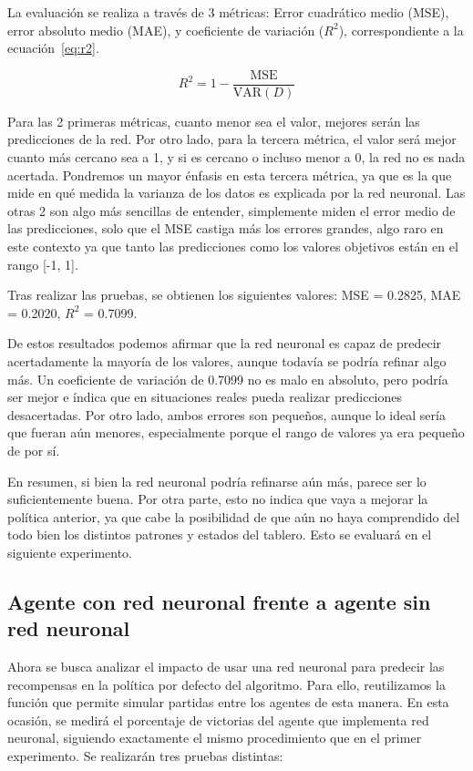 \documentclass[conference,a4paper]{IEEEtran}
\begin{document}
La evaluación se realiza a través de 3 métricas: Error cuadrático medio (MSE), error absoluto medio (MAE), y coeficiente de variación ($R^2$), correspondiente a la ecuación~\eqref{eq:r2}. 

\begin{equation}
  \label{eq:r2}
  R^2 = 1 - \frac{\mathrm{MSE}}{\mathrm{VAR}(D)}
\end{equation}

Para las 2 primeras métricas, cuanto menor sea el valor, mejores serán las predicciones de la red. Por otro lado, 
para la tercera métrica, el valor será mejor cuanto más cercano sea a 1, y si es cercano o incluso menor a 0, la red 
no es nada acertada. Pondremos un mayor énfasis en esta tercera métrica, ya que es la que mide en qué medida la 
varianza de los datos es explicada por la red neuronal. Las otras 2 son algo más sencillas de entender, simplemente 
miden el error medio de las predicciones, solo que el MSE castiga más los errores grandes, algo raro en este contexto 
ya que tanto las predicciones como los valores objetivos están en el rango [-1, 1].

Tras realizar las pruebas, se obtienen los siguientes valores: MSE = 0.2825, MAE = 0.2020, $R^2$ = 0.7099.

De estos resultados podemos afirmar que la red neuronal es capaz de predecir acertadamente la mayoría de los valores, aunque todavía 
se podría refinar algo más. Un coeficiente de variación de 0.7099 no es malo en absoluto, pero podría ser mejor e índica que en situaciones 
reales pueda realizar predicciones desacertadas. Por otro lado, ambos errores son pequeños, aunque lo ideal sería que fueran aún menores, 
especialmente porque el rango de valores ya era pequeño de por sí.

En resumen, si bien la red neuronal podría refinarse aún más, parece ser lo suficientemente buena. Por otra parte, esto no 
indica que vaya a mejorar la política anterior, ya que cabe la posibilidad de que aún no haya comprendido del todo bien los 
distintos patrones y estados del tablero. Esto se evaluará en el siguiente experimento.

\subsection{Agente con red neuronal frente a agente sin red neuronal}

Ahora se busca analizar el impacto de usar una red neuronal para predecir las recompensas en la política por defecto del algoritmo. 
Para ello, reutilizamos la función que permite simular partidas entre los agentes de esta manera. En esta ocasión, se medirá el porcentaje de victorias 
del agente que implementa red neuronal, siguiendo exactamente el mismo procedimiento que en el primer experimento. Se realizarán tres pruebas distintas:
\end{document}
